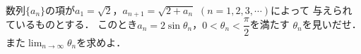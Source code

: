 \documentclass[../../main.tex]{subfiles}
\begin{document}
数列$\{ a_n \}$の項が$a_1=\sqrt2$，$a_{n+1}=\sqrt{2+a_n}$ $(n=1,2,3,\cdots)$によって
与えられているものとする．
このとき$a_n=2\sin{\theta}_n$，$\displaystyle 0<{\theta}_n<\dfrac{\pi}{2}$を満たす
${\theta}_n$を見いだせ．
また$\displaystyle\lim_{n\to\infty}{\theta}_n$を求めよ．
\end{document}
